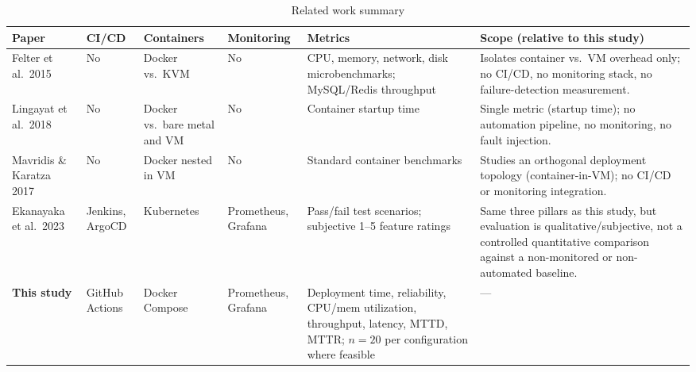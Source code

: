 \documentclass[conference]{IEEEtran}
\begin{document}
\begin{table}[t]
\centering
\caption{Related work summary}
\label{tab:related}
\small
\setlength{\tabcolsep}{4pt}
\begin{tabular}{@{}>{\raggedright\arraybackslash}p{2.5cm}>{\raggedright\arraybackslash}p{1.6cm}>{\raggedright\arraybackslash}p{1.6cm}>{\raggedright\arraybackslash}p{1.7cm}>{\raggedright\arraybackslash}p{3.6cm}>{\raggedright\arraybackslash}p{5.6cm}@{}}
\toprule
\textbf{Paper} & \textbf{CI/CD} & \textbf{Containers} & \textbf{Monitoring} & \textbf{Metrics} & \textbf{Scope (relative to this study)} \\
\midrule
Felter et al.\ 2015~\cite{felter2015} & No & Docker vs.\ KVM & No &
CPU, memory, network, disk microbenchmarks; MySQL/Redis throughput &
Isolates container vs.\ VM overhead only; no CI/CD, no monitoring stack, no
failure-detection measurement. \\
Lingayat et al.\ 2018~\cite{lingayat2018} & No & Docker vs.\ bare metal and VM &
No & Container startup time & Single metric (startup time); no automation
pipeline, no monitoring, no fault injection. \\
Mavridis \& Karatza 2017~\cite{mavridis2017} & No & Docker nested in VM & No &
Standard container benchmarks & Studies an orthogonal deployment topology
(container-in-VM); no CI/CD or monitoring integration. \\
Ekanayaka et al.\ 2023~\cite{ekanayaka2023} & Jenkins, ArgoCD & Kubernetes &
Prometheus, Grafana & Pass/fail test scenarios;
subjective 1--5 feature ratings & Same three pillars as this study, but
evaluation is qualitative/subjective, not a controlled quantitative
comparison against a non-monitored or non-automated baseline. \\
\textbf{This study} & GitHub Actions & Docker Compose & Prometheus, Grafana &
Deployment time, reliability, CPU/mem utilization,
throughput, latency, MTTD, MTTR; $n{=}20$ per
configuration where feasible & --- \\
\bottomrule
\end{tabular}
\end{table}
\end{document}
